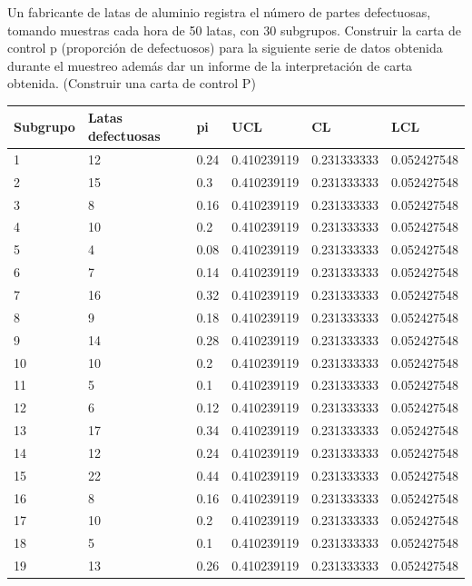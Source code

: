 \documentclass{article}
\theoremstyle{mytheoremstyle}
\theoremstyle{mytheoremstyle}
\theoremstyle{myproblemstyle}
\begin{document}
	Un fabricante de latas de aluminio registra el número de partes defectuosas, tomando
	muestras cada hora de 50 latas, con 30 subgrupos. Construir la carta de control p (proporción de
	defectuosos) para la siguiente serie de datos obtenida durante el muestreo además dar un
	informe de la interpretación de carta obtenida. (Construir una carta de control P)
	\begin{table}[ht!]
		\centering
		\begin{tabular}{|l|l|l|l|l|l|}
		\hline
			Subgrupo & Latas defectuosas & pi & UCL & CL & LCL \\ \hline
			1 & 12 & 0.24 & 0.410239119 & 0.231333333 & 0.052427548 \\ \hline
			2 & 15 & 0.3 & 0.410239119 & 0.231333333 & 0.052427548 \\ \hline
			3 & 8 & 0.16 & 0.410239119 & 0.231333333 & 0.052427548 \\ \hline
			4 & 10 & 0.2 & 0.410239119 & 0.231333333 & 0.052427548 \\ \hline
			5 & 4 & 0.08 & 0.410239119 & 0.231333333 & 0.052427548 \\ \hline
			6 & 7 & 0.14 & 0.410239119 & 0.231333333 & 0.052427548 \\ \hline
			7 & 16 & 0.32 & 0.410239119 & 0.231333333 & 0.052427548 \\ \hline
			8 & 9 & 0.18 & 0.410239119 & 0.231333333 & 0.052427548 \\ \hline
			9 & 14 & 0.28 & 0.410239119 & 0.231333333 & 0.052427548 \\ \hline
			10 & 10 & 0.2 & 0.410239119 & 0.231333333 & 0.052427548 \\ \hline
			11 & 5 & 0.1 & 0.410239119 & 0.231333333 & 0.052427548 \\ \hline
			12 & 6 & 0.12 & 0.410239119 & 0.231333333 & 0.052427548 \\ \hline
			13 & 17 & 0.34 & 0.410239119 & 0.231333333 & 0.052427548 \\ \hline
			14 & 12 & 0.24 & 0.410239119 & 0.231333333 & 0.052427548 \\ \hline
			15 & 22 & 0.44 & 0.410239119 & 0.231333333 & 0.052427548 \\ \hline
			16 & 8 & 0.16 & 0.410239119 & 0.231333333 & 0.052427548 \\ \hline
			17 & 10 & 0.2 & 0.410239119 & 0.231333333 & 0.052427548 \\ \hline
			18 & 5 & 0.1 & 0.410239119 & 0.231333333 & 0.052427548 \\ \hline
			19 & 13 & 0.26 & 0.410239119 & 0.231333333 & 0.052427548 \\ \hline

\end{tabular}
\end{table}
\end{document}
